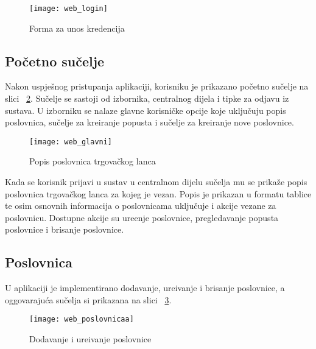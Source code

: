 \begin{figure}[!htbp]
	\begin{center}
 \texttt{[image: web\_login]}
 \caption{Forma za unos kredencija}
 \label{fig:webLogin}
	\end{center}
\end{figure}


\subsection{Po\v{c}etno su\v{c}elje}

Nakon uspje\v{s}nog pristupanja aplikaciji, korisniku je prikazano po\v{c}etno su\v{c}elje na slici ~\ref{fig:web_glavni}. Su\v{c}elje se sastoji od izbornika, centralnog dijela i tipke za odjavu iz sustava. U izborniku se nalaze glavne korisni\v{c}ke opcije koje uklju\v{c}uju popis poslovnica, su\v{c}elje za kreiranje popusta i su\v{c}elje za kreiranje nove poslovnice.


\begin{figure}[!htbp]
	\begin{center}
 \texttt{[image: web\_glavni]}
 \caption{Popis poslovnica trgova\v{c}kog lanca}
 \label{fig:web_glavni}
	\end{center}
\end{figure}

Kada se korisnik prijavi u sustav u centralnom dijelu su\v{c}elja mu se prika\v{z}e popis poslovnica trgova\v{c}kog lanca za kojeg je vezan. Popis je prikazan u formatu tablice te osim osnovnih informacija o poslovnicama uklju\v{c}uje i akcije vezane za poslovnicu. Dostupne akcije su ure\dj enje poslovnice, pregledavanje popusta poslovnice i brisanje poslovnice.


\subsection{Poslovnica}

U aplikaciji je implementirano dodavanje, ure\dj ivanje i brisanje poslovnice, a oggovaraju\'{c}a su\v{c}elja si prikazana na slici ~\ref{fig:web_poslovnicaa}.

\begin{figure}[!htbp]
	\begin{center}
 \texttt{[image: web\_poslovnicaa]}
 \caption{Dodavanje i ure\dj ivanje poslovnice}
 \label{fig:web_poslovnicaa}
	\end{center}
\end{figure}


